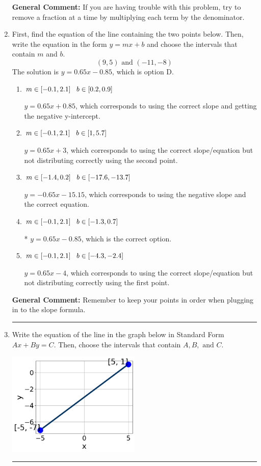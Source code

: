 \documentclass{extbook}[14pt]
\newcommand{\litem}[1]{\item #1

\rule{\textwidth}{0.4pt}}
\begin{document}
\begin{enumerate}
{\textbf{General Comment:} If you are having trouble with this problem, try to remove a fraction at a time by multiplying each term by the denominator.
}
\litem{
First, find the equation of the line containing the two points below. Then, write the equation in the form $ y=mx+b $ and choose the intervals that contain $m$ and $b$.
\[ (9, 5) \text{ and } (-11, -8) \]The solution is \( y = 0.65x -0.85 \), which is option D.\begin{enumerate}[label=\Alph*.]
\item \( m \in [-0.1, 2.1] \hspace*{3mm} b \in [0.2, 0.9] \)

 $y = 0.65x + 0.85$, which corresponds to using the correct slope and getting the negative y-intercept.
\item \( m \in [-0.1, 2.1] \hspace*{3mm} b \in [1, 5.7] \)

 $y = 0.65x + 3$, which corresponds to using the correct slope/equation but not distributing correctly using the second point.
\item \( m \in [-1.4, 0.2] \hspace*{3mm} b \in [-17.6, -13.7] \)

 $y = -0.65x -15.15$, which corresponds to using the negative slope and the correct equation.
\item \( m \in [-0.1, 2.1] \hspace*{3mm} b \in [-1.3, 0.7] \)

* $y = 0.65x -0.85$, which is the correct option.
\item \( m \in [-0.1, 2.1] \hspace*{3mm} b \in [-4.3, -2.4] \)

 $y = 0.65x -4$, which corresponds to using the correct slope/equation but not distributing correctly using the first point.
\end{enumerate}

\textbf{General Comment:} Remember to keep your points in order when plugging in to the slope formula.
}
\litem{
Write the equation of the line in the graph below in Standard Form $Ax+By=C$. Then, choose the intervals that contain $A, B, \text{ and } C$.

\begin{center}
    \includegraphics[width=0.5\textwidth]{../Figures/linearGraphToStandardC.png}
\end{center}


}
\end{enumerate}
\end{document}
